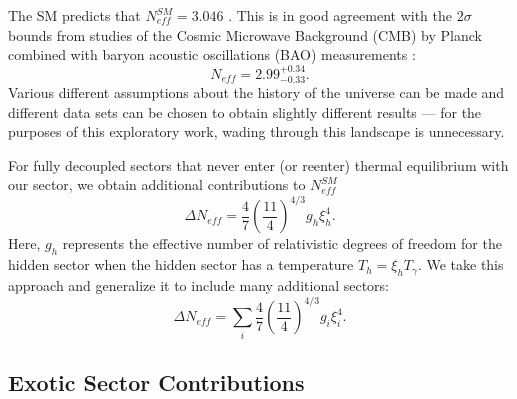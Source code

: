\documentclass[nofootinbib,twocolumn,preprintnumbers]{revtex4-1}
\begin{document}
The SM predicts that $N^{SM}_{eff} = 3.046$ \cite{Mangano:2005cc}. This is in good agreement with the $2\sigma$ bounds from studies of the Cosmic Microwave Background (CMB) by Planck combined with baryon acoustic oscillations (BAO) measurements \cite{Aghanim:2018eyx}:
\begin{equation}\label{eqn:NeffBounds}
N_{eff} = 2.99^{+0.34}_{-0.33}.
\end{equation}
Various different assumptions about the history of the universe can be made and different data sets can be chosen to obtain slightly different results \cite{Breitbach:2018ddu} --- for the purposes of this exploratory work, wading through this landscape is unnecessary.

For fully decoupled sectors that never enter (or reenter) thermal equilibrium with our sector, we obtain additional contributions to $N^{SM}_{eff}$ \cite{Breitbach:2018ddu}
\begin{equation}\label{eqn:DeltaNeff1hs}
\Delta N_{eff} = \frac{4}{7}\left(\frac{11}{4}\right)^{4/3}g_h \xi_h^4.
\end{equation} 
Here, $g_h$ represents the effective number of relativistic degrees of freedom for the hidden sector when the hidden sector has a temperature $T_h = \xi_h T_\gamma$.  
We take this approach and generalize it to include many additional sectors:
\begin{equation}\label{eqn:DeltaNeff}
\Delta N_{eff} = \sum_i \frac{4}{7}\left(\frac{11}{4}\right)^{4/3}g_{i} \xi^4_{i}.
\end{equation} 


\subsection{Exotic Sector Contributions}
\end{document}

